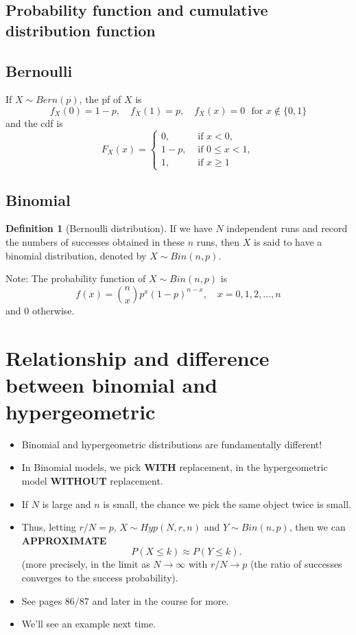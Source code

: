 \documentclass[
]{book}
\providecommand{\tightlist}{%
  \setlength{\itemsep}{0pt}\setlength{\parskip}{0pt}}
\theoremstyle{definition}
\newtheorem{definition}{Definition}[chapter]
\theoremstyle{definition}
\theoremstyle{definition}
\theoremstyle{definition}
\theoremstyle{remark}
\begin{document}
\subsection{Probability function and cumulative distribution function}\label{probability-function-and-cumulative-distribution-function}

\subsection{Bernoulli}\label{bernoulli}

If \(X\sim Bern(p)\), the pf of \(X\) is
\[ f_X(0)=1-p,\quad f_X(1)=p,\quad f_X(x)=0\,\,\text{ for }x\not\in\{0,1\}\]
and the cdf is
\[ F_X(x)=\begin{cases} 0, &\text{ if }x<0, \\ 1-p, &\text{ if } 0\leq x < 1,\\ 1, &\text{ if }x\geq 1\end{cases}\]

\subsection{Binomial}\label{binomial}

\begin{definition}[Bernoulli distribution]
If we have \(N\) independent runs and record the numbers of successes obtained in these \(n\) runs, then \(X\) is said to have a binomial distribution, denoted by \(X\sim Bin(n,p)\).
\end{definition}

Note: The probability function of \(X\sim Bin(n, p)\) is
\[ f(x) = \binom{n}{x} p^x(1-p)^{n-x},\quad x=0,1,2,\dots,n\]
and 0 otherwise.

\section{Relationship and difference between binomial and hypergeometric}\label{relationship-and-difference-between-binomial-and-hypergeometric}

\begin{itemize}
\tightlist
\item
  Binomial and hypergeometric distributions are fundamentally different!
\item
  In Binomial models, we pick \textbf{WITH} replacement, in the hypergeometric model \textbf{WITHOUT} replacement.
\item
  If \(N\) is large and \(n\) is small, the chance we pick the same object twice is small.
\item
  Thus, letting \(r/N=p\), \(X\sim Hyp(N,r,n)\) and \(Y\sim Bin(n,p)\), then we can \textbf{APPROXIMATE}
  \[ P(X \leq k) \approx P(Y\leq k).\]
  (more precisely, in the limit as \(N\rightarrow\infty\) with \(r/N\rightarrow p\) (the ratio of successes converges to the success probability).
\item
  See pages 86/87 and later in the course for more.
\item
  We'll see an example next time.
\end{itemize}
\end{document}
